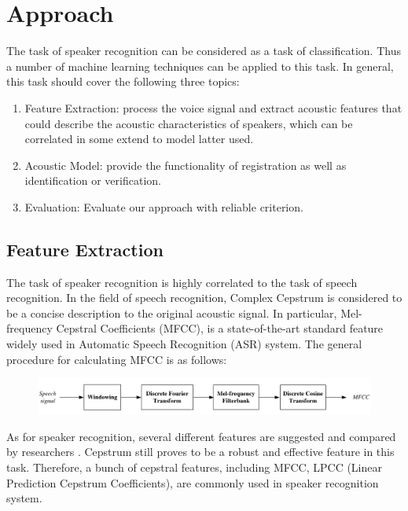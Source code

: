 

\section{Approach}
The task of speaker recognition can be considered as a task of classification. Thus a number of machine learning techniques
can be applied to this task. In general, this task should cover the following three topics:

\begin{enumerate}
  \item Feature Extraction: process the voice signal and extract acoustic features that
	  could describe the acoustic characteristics of speakers, which can be correlated
	  in some extend to model latter used.

  \item Acoustic Model: provide the functionality of registration as well as identification or verification.

  \item Evaluation: Evaluate our approach with reliable criterion.
\end{enumerate}

\subsection{Feature Extraction}
The task of speaker recognition is highly correlated to the task of speech recognition.
In the field of speech recognition, Complex Cepstrum \cite{cepstrum} is
considered to be a concise description to the original acoustic signal.
In particular, Mel-frequency Cepstral Coefficients (MFCC), is a state-of-the-art standard feature
widely used in Automatic Speech Recognition (ASR) system.
The general procedure for calculating MFCC is as follows:
\begin{figure}[H]
  \centering
  \includegraphics[width=\textwidth]{res/MFCC.png}
\end{figure}

As for speaker recognition, several different features are suggested and compared
by researchers \cite{evaluation}. Cepstrum still proves to be a robust and effective
feature in this task. Therefore, a bunch of cepstral features, including MFCC,
LPCC (Linear Prediction Cepstrum Coefficients), are commonly used
in speaker recognition system.\cite{feature}

